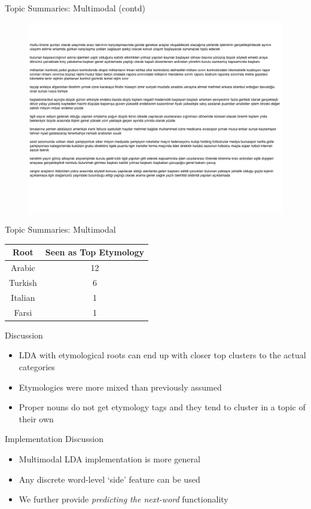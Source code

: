 \documentclass[pdf]{beamer}
\begin{document}
\begin{frame}{Topic Summaries: Multimodal (contd)}
\begin{figure}
\label{fig:sum22}
\includegraphics*[width=\textwidth]{topics2-2.jpeg}
\end{figure}
\end{frame}

\begin{frame}{Topic Summaries: Multimodal}
\begin{tabular}{c|c}
Root&Seen as Top Etymology\\
\hline
Arabic&12\\
Turkish&6\\
Italian&1\\
Farsi&1
\end{tabular}
\end{frame}

\begin{frame}{Discussion}
\begin{itemize}
\item LDA with etymological roots can end up with closer top clusters to the actual categories
\item Etymologies were more mixed than previously assumed
\item Proper nouns do not get etymology tags and they tend to cluster in a topic of their own
\end{itemize}
\end{frame}

\begin{frame}{Implementation Discussion}
\begin{itemize}
\item Multimodal LDA implementation is more general
\item Any discrete word-level `side' feature can be used
\item We further provide \textit{predicting the next-word} functionality
\end{itemize}
\end{frame}
\end{document}
